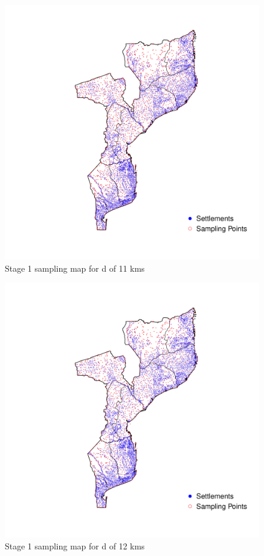 \documentclass[
  12pt,
  a4paper]{article}
\begin{document}
\begin{figure}[H]

{\centering \includegraphics{mozambiqueNotes_files/figure-latex/stage1plot11-1} 

}

\caption{Stage 1 sampling map for d of 11 kms}\label{fig:stage1plot11}
\end{figure}

\begin{figure}[H]

{\centering \includegraphics{mozambiqueNotes_files/figure-latex/stage1plot12-1} 

}

\caption{Stage 1 sampling map for d of 12 kms}\label{fig:stage1plot12}
\end{figure}
\end{document}
